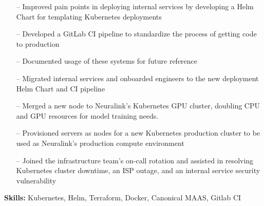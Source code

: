 \documentclass[9pt,a4paper]{altacv}
\begin{document}
\tagline{}

\begin{fullwidth}
    \makecvheader
\end{fullwidth}






\begin{itemize}
    \setlength{\itemindent}{0.5em}
    \item[--] Improved pain points in deploying internal services by developing a Helm Chart for templating Kubernetes deployments
    \item[--] Developed a GitLab CI pipeline to standardize the process of getting code to production
    \item[--] Documented usage of these systems for future reference
    \item[--] Migrated internal services and onboarded engineers to the new deployment Helm Chart and CI pipeline
    \item[--] Merged a new node to Neuralink's Kubernetes GPU cluster, doubling CPU and GPU resources for model training needs.
    \item[--] Provisioned servers as nodes for a new Kubernetes production cluster to be used as Neuralink's production compute environment
    \item[--] Joined the infrastructure team's on-call rotation and assisted in resolving Kubernetes cluster downtime, an ISP outage, and an internal service security vulnerability
\end{itemize}
\smallskip
\textbf{Skills:} Kubernetes, Helm, Terraform, Docker, Canonical MAAS, Gitlab CI
\end{document}
